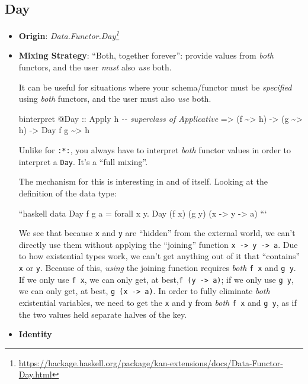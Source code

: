 \documentclass[]{article}
\newenvironment{Shaded}{}{}
\newcommand{\CommentTok}[1]{\textcolor[rgb]{0.38,0.63,0.69}{\textit{#1}}}
\newcommand{\DataTypeTok}[1]{\textcolor[rgb]{0.56,0.13,0.00}{#1}}
\newcommand{\NormalTok}[1]{#1}
\newcommand{\OperatorTok}[1]{\textcolor[rgb]{0.40,0.40,0.40}{#1}}
\newcommand{\OtherTok}[1]{\textcolor[rgb]{0.00,0.44,0.13}{#1}}
\renewcommand{\href}[2]{#2\footnote{\url{#1}}}
\begin{document}
\hypertarget{day}{%
\subsection{Day}\label{day}}

\begin{itemize}
\item
  \textbf{Origin}:
  \emph{\href{https://hackage.haskell.org/package/kan-extensions/docs/Data-Functor-Day.html}{Data.Functor.Day}}
\item
  \textbf{Mixing Strategy}: ``Both, together forever'': provide values from
  \emph{both} functors, and the user \emph{must} also \emph{use} both.

  It can be useful for situations where your schema/functor must be
  \emph{specified} using \emph{both} functors, and the user must also \emph{use}
  both.

\begin{Shaded}
\begin{Highlighting}[]
\NormalTok{binterpret }\OperatorTok{@}\DataTypeTok{Day}
\OtherTok{    ::} \DataTypeTok{Apply}\NormalTok{ h          }\CommentTok{{-}{-} superclass of Applicative}
    \OtherTok{=>}\NormalTok{ (f }\OperatorTok{\textasciitilde{}>}\NormalTok{ h)}
    \OtherTok{{-}>}\NormalTok{ (g }\OperatorTok{\textasciitilde{}>}\NormalTok{ h)}
    \OtherTok{{-}>} \DataTypeTok{Day}\NormalTok{ f g }\OperatorTok{\textasciitilde{}>}\NormalTok{ h}
\end{Highlighting}
\end{Shaded}

  Unlike for \texttt{:*:}, you always have to interpret \emph{both} functor
  values in order to interpret a \texttt{Day}. It's a ``full mixing''.

  The mechanism for this is interesting in and of itself. Looking at the
  definition of the data type:

  ``haskell data Day f g a = forall x y. Day (f x) (g y) (x -\textgreater{} y
  -\textgreater{} a) ```

  We see that because \texttt{x} and \texttt{y} are ``hidden'' from the external
  world, we can't directly use them without applying the ``joining'' function
  \texttt{x\ -\textgreater{}\ y\ -\textgreater{}\ a}. Due to how existential
  types work, we can't get anything out of it that ``contains'' \texttt{x} or
  \texttt{y}. Because of this, \emph{using} the joining function requires
  \emph{both} \texttt{f\ x} and \texttt{g\ y}. If we only use \texttt{f\ x}, we
  can only get, at best,\texttt{f\ (y\ -\textgreater{}\ a)}; if we only use
  \texttt{g\ y}, we can only get, at best, \texttt{g\ (x\ -\textgreater{}\ a)}.
  In order to fully eliminate \emph{both} existential variables, we need to get
  the \texttt{x} and \texttt{y} from \emph{both} \texttt{f\ x} and
  \texttt{g\ y}, as if the two values held separate halves of the key.
\item
  \textbf{Identity}


\end{itemize}
\end{document}
